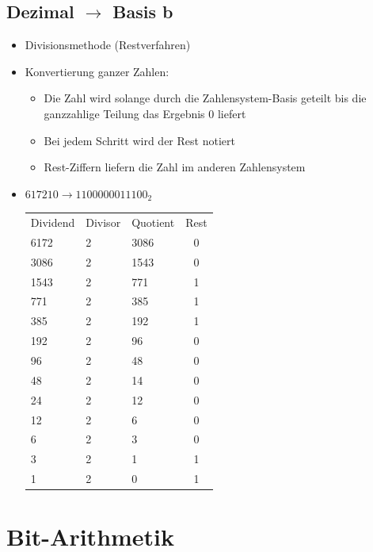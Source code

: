\documentclass[xcolor=dvipsnames]{beamer}
\begin{document}
\subsection{Dezimal $\rightarrow$ Basis b}
\begin{frame}
\begin{itemize}
	\item Divisionsmethode (Restverfahren)
	\item Konvertierung ganzer Zahlen: 
	\begin{itemize}
		\item Die Zahl wird solange durch die Zahlensystem-Basis geteilt bis die ganzzahlige Teilung das Ergebnis 0 liefert
		\item  Bei jedem Schritt wird der Rest notiert
		\item Rest-Ziffern liefern die Zahl im anderen Zahlensystem
	\end{itemize}
\end{itemize}	
\end{frame}

\begin{frame}
\begin{itemize}
 \item $6172{10} \rightarrow 1100000011100_2$ 
 \begin{table}
\begin{tabular}{lllc} 
Dividend & Divisor & Quotient & Rest\\
6172 & 2 & 3086 & 0 \\
3086 & 2 & 1543 & 0 \\
1543 & 2 & 771 & 1 \\
771 & 2 & 385 & 1 \\
385 & 2 & 192 & 1 \\
192 & 2 & 96 & 0 \\
96 & 2 & 48 & 0 \\
48 & 2 & 14 & 0 \\
24 & 2 & 12 & 0 \\
12 & 2 & 6 & 0 \\
6 & 2 & 3 & 0 \\
3 & 2 & 1 & 1 \\
1 & 2 & 0 & 1 
\end{tabular}
 \end{table}
\end{itemize}
\end{frame}

\section{Bit-Arithmetik}
\end{document}
